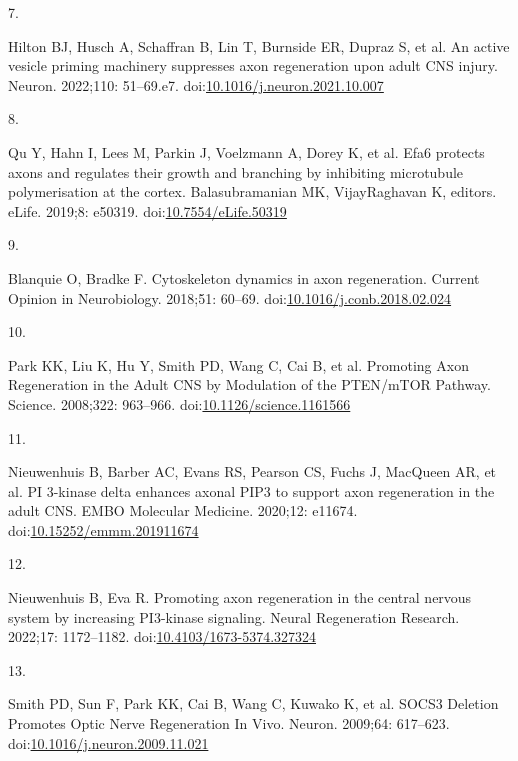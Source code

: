 \documentclass[
  12pt,
  a4paper,
]{book}
\newlength{\cslhangindent}
\newlength{\csllabelwidth}
\newlength{\cslentryspacingunit} %
\newenvironment{CSLReferences}[2] %
 {%
  \setlength{\parindent}{0pt}
  \ifodd #1
  \let\oldpar\par
  \def\par{\hangindent=\cslhangindent\oldpar}
  \fi
  \setlength{\parskip}{#2\cslentryspacingunit}
 }%
 {}
\newcommand{\CSLLeftMargin}[1]{\parbox[t]{\csllabelwidth}{#1}}
\newcommand{\CSLRightInline}[1]{\parbox[t]{\linewidth - \csllabelwidth}{#1}\break}
\begin{document}
\begin{CSLReferences}{0}{0}
\leavevmode{}%
\CSLLeftMargin{7. }%
\CSLRightInline{Hilton BJ, Husch A, Schaffran B, Lin T, Burnside ER, Dupraz S, et al. An active vesicle priming machinery suppresses axon regeneration upon adult {CNS} injury. Neuron. 2022;110: 51--69.e7. doi:\href{https://doi.org/10.1016/j.neuron.2021.10.007}{10.1016/j.neuron.2021.10.007}}

\leavevmode{}%
\CSLLeftMargin{8. }%
\CSLRightInline{Qu Y, Hahn I, Lees M, Parkin J, Voelzmann A, Dorey K, et al. Efa6 protects axons and regulates their growth and branching by inhibiting microtubule polymerisation at the cortex. Balasubramanian MK, VijayRaghavan K, editors. eLife. 2019;8: e50319. doi:\href{https://doi.org/10.7554/eLife.50319}{10.7554/eLife.50319}}

\leavevmode{}%
\CSLLeftMargin{9. }%
\CSLRightInline{Blanquie O, Bradke F. Cytoskeleton dynamics in axon regeneration. Current Opinion in Neurobiology. 2018;51: 60--69. doi:\href{https://doi.org/10.1016/j.conb.2018.02.024}{10.1016/j.conb.2018.02.024}}

\leavevmode{}%
\CSLLeftMargin{10. }%
\CSLRightInline{Park KK, Liu K, Hu Y, Smith PD, Wang C, Cai B, et al. Promoting {Axon Regeneration} in the {Adult CNS} by {Modulation} of the {PTEN}/{mTOR Pathway}. Science. 2008;322: 963--966. doi:\href{https://doi.org/10.1126/science.1161566}{10.1126/science.1161566}}

\leavevmode{}%
\CSLLeftMargin{11. }%
\CSLRightInline{Nieuwenhuis B, Barber AC, Evans RS, Pearson CS, Fuchs J, MacQueen AR, et al. {PI} 3-kinase delta enhances axonal {PIP3} to support axon regeneration in the adult {CNS}. EMBO Molecular Medicine. 2020;12: e11674. doi:\href{https://doi.org/10.15252/emmm.201911674}{10.15252/emmm.201911674}}

\leavevmode{}%
\CSLLeftMargin{12. }%
\CSLRightInline{Nieuwenhuis B, Eva R. Promoting axon regeneration in the central nervous system by increasing {PI3-kinase} signaling. Neural Regeneration Research. 2022;17: 1172--1182. doi:\href{https://doi.org/10.4103/1673-5374.327324}{10.4103/1673-5374.327324}}

\leavevmode{}%
\CSLLeftMargin{13. }%
\CSLRightInline{Smith PD, Sun F, Park KK, Cai B, Wang C, Kuwako K, et al. {SOCS3 Deletion Promotes Optic Nerve Regeneration In Vivo}. Neuron. 2009;64: 617--623. doi:\href{https://doi.org/10.1016/j.neuron.2009.11.021}{10.1016/j.neuron.2009.11.021}}


\end{CSLReferences}
\end{document}
